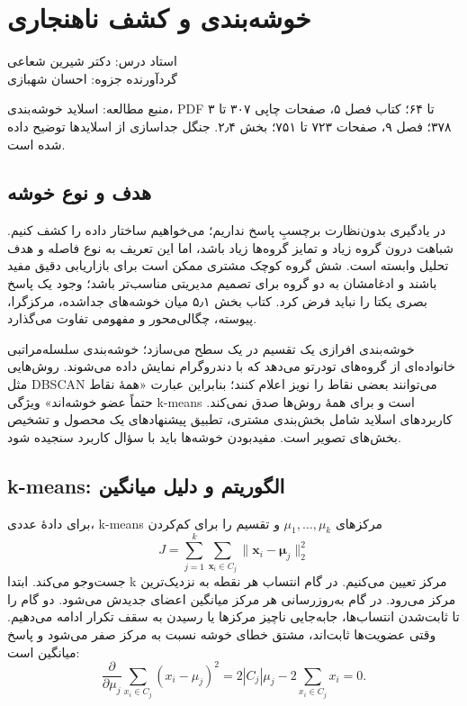 \documentclass[12pt,a4paper,oneside]{report}
\newcommand{\source}[1]{\par{\small\color{muted} منبع مطالعه: #1}\par}
\begin{document}
\setcounter{chapter}{5}
\chapter{خوشه‌بندی و کشف ناهنجاری}
\begin{center}{\small\color{muted} استاد درس: دکتر شیرین شعاعی\\[2mm] گردآورنده جزوه: احسان شهبازی}\end{center}

\source{اسلاید خوشه‌بندی، PDF ۳ تا ۶۴؛ کتاب فصل ۵، صفحات چاپی ۳۰۷ تا ۳۷۸؛ فصل ۹، صفحات ۷۲۳ تا ۷۵۱؛ بخش ۲٫۴. جنگل جداسازی از اسلایدها توضیح داده شده است.}
\section{هدف و نوع خوشه}

در یادگیری بدون‌نظارت برچسبِ پاسخ نداریم؛ می‌خواهیم ساختار داده را کشف کنیم. شباهت درون گروه زیاد و تمایز گروه‌ها زیاد باشد، اما این تعریف به نوع فاصله و هدف تحلیل وابسته است. شش گروه کوچک مشتری ممکن است برای بازاریابی دقیق مفید باشند و ادغامشان به دو گروه برای تصمیم مدیریتی مناسب‌تر باشد؛ وجود یک پاسخ بصری یکتا را نباید فرض کرد. کتاب بخش ۵٫۱ میان خوشه‌های جداشده، مرکزگرا، پیوسته، چگالی‌محور و مفهومی تفاوت می‌گذارد.

خوشه‌بندی افرازی یک تقسیم در یک سطح می‌سازد؛ خوشه‌بندی سلسله‌مراتبی خانواده‌ای از گروه‌های تودرتو می‌دهد که با دندروگرام نمایش داده می‌شوند. روش‌هایی مثل DBSCAN می‌توانند بعضی نقاط را نویز اعلام کنند؛ بنابراین عبارت «همهٔ نقاط حتماً عضو خوشه‌اند» ویژگی k-means است و برای همهٔ روش‌ها صدق نمی‌کند. کاربردهای اسلاید شامل بخش‌بندی مشتری، تطبیق پیشنهادهای یک محصول و تشخیص بخش‌های تصویر است. مفیدبودن خوشه‌ها باید با سؤال کاربرد سنجیده شود.

\section{k-means: الگوریتم و دلیل میانگین}

برای دادهٔ عددی، k-means مرکزهای \(\mu_1,\ldots,\mu_k\) و تقسیم را برای کم‌کردن \[
J=\sum_{j=1}^k\sum_{\boldsymbol x_i\in C_j}\|\boldsymbol x_i-\boldsymbol\mu_j\|_2^2
\] جست‌وجو می‌کند. ابتدا k مرکز تعیین می‌کنیم. در گام انتساب هر نقطه به نزدیک‌ترین مرکز می‌رود. در گام به‌روزرسانی هر مرکز میانگین اعضای جدیدش می‌شود. دو گام را تا ثابت‌شدن انتساب‌ها، جابه‌جایی ناچیز مرکزها یا رسیدن به سقف تکرار ادامه می‌دهیم. وقتی عضویت‌ها ثابت‌اند، مشتق خطای خوشه نسبت به مرکز صفر می‌شود و پاسخ میانگین است: \[
\frac{\partial}{\partial\mu_j}\sum_{x_i\in C_j}(x_i-\mu_j)^2=2|C_j|\mu_j-2\sum_{x_i\in C_j}x_i=0.
\]
\end{document}
